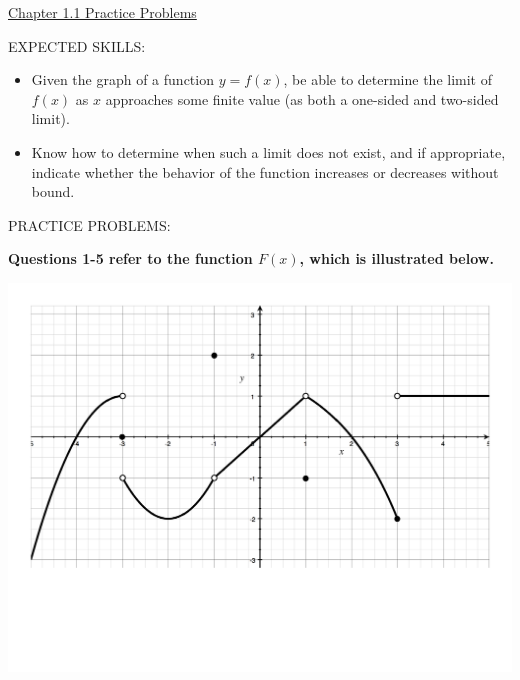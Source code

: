 \documentclass[12pt]{article}
\begin{document}
\begin{center}
\underline{\LARGE{Chapter 1.1 Practice Problems}}
\end{center}

EXPECTED SKILLS:

\begin{itemize}

\item Given the graph of a function $y=f(x)$, be able to determine the limit of $f(x)$ as $x$ approaches some finite value (as both a one-sided and two-sided limit).

\item Know how to determine when such a limit does not exist, and if appropriate, indicate whether the behavior of the function increases or decreases without bound.

\end{itemize}

PRACTICE PROBLEMS:

{\bf Questions 1-5 refer to the function $F(x)$, which is illustrated below.}

\begin{center}
\includegraphics[scale=0.5]{Limits1.pdf}
\end{center}
\end{document}
